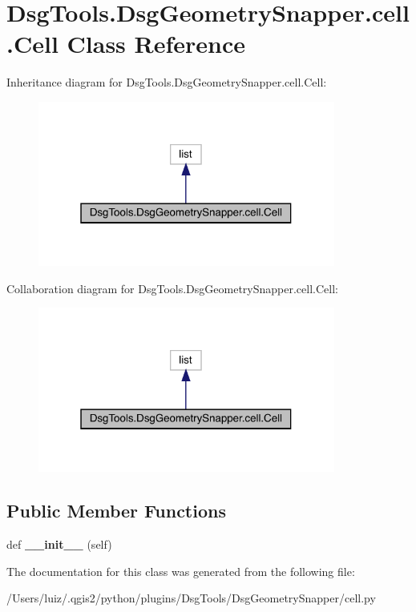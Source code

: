 \hypertarget{class_dsg_tools_1_1_dsg_geometry_snapper_1_1cell_1_1_cell}{}\section{Dsg\+Tools.\+Dsg\+Geometry\+Snapper.\+cell.\+Cell Class Reference}
\label{class_dsg_tools_1_1_dsg_geometry_snapper_1_1cell_1_1_cell}


Inheritance diagram for Dsg\+Tools.\+Dsg\+Geometry\+Snapper.\+cell.\+Cell\+:
\nopagebreak
\begin{figure}[H]
\begin{center}
\leavevmode
\includegraphics[width=277pt]{class_dsg_tools_1_1_dsg_geometry_snapper_1_1cell_1_1_cell__inherit__graph}
\end{center}
\end{figure}


Collaboration diagram for Dsg\+Tools.\+Dsg\+Geometry\+Snapper.\+cell.\+Cell\+:
\nopagebreak
\begin{figure}[H]
\begin{center}
\leavevmode
\includegraphics[width=277pt]{class_dsg_tools_1_1_dsg_geometry_snapper_1_1cell_1_1_cell__coll__graph}
\end{center}
\end{figure}
\subsection*{Public Member Functions}
\begin{DoxyCompactItemize}
\item 
\mbox{\label{class_dsg_tools_1_1_dsg_geometry_snapper_1_1cell_1_1_cell_a3c8c3afc99e71c1f29ace89a8c2caf30}} 
def {\bfseries \+\_\+\+\_\+init\+\_\+\+\_\+} (self)
\end{DoxyCompactItemize}


The documentation for this class was generated from the following file\+:\begin{DoxyCompactItemize}
\item 
/\+Users/luiz/.\+qgis2/python/plugins/\+Dsg\+Tools/\+Dsg\+Geometry\+Snapper/cell.\+py\end{DoxyCompactItemize}
